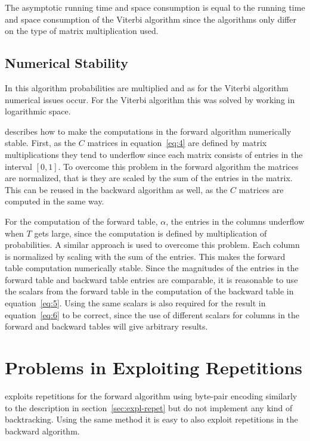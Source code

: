 The asymptotic running time and space consumption is equal to the running time
and space consumption of the Viterbi algorithm since the algorithms only
differ on the type of matrix multiplication used.

\subsection{Numerical Stability}

In this algorithm probabilities are multiplied and as for the Viterbi algorithm
numerical issues occur. For the Viterbi algorithm this was solved by working in
logarithmic space.

\citet{sand2013ziphmmlib} describes how to make the computations in the forward
algorithm numerically stable. First, as the $C$ matrices in
equation~\eqref{eq:4} are defined by matrix multiplications they tend to
underflow since each matrix consists of entries in the interval $[0, 1]$. To
overcome this problem in the forward algorithm the matrices are normalized,
that is they are scaled by the sum of the entries in the matrix. This can be
reused in the backward algorithm as well, as the $C$ matrices are computed in
the same way.

For the computation of the forward table, $\alpha$, the entries in the columns underflow when
$T$ gets large, since the computation is defined by multiplication of
probabilities. A similar approach is used to overcome this problem. Each column
is normalized by scaling with the sum of the entries. This makes the forward
table computation numerically stable. Since the magnitudes of the entries in
the forward table and backward table entries are comparable, it is reasonable
to use the scalars from the forward table in the computation of the backward
table in equation~\eqref{eq:5}. Using the same scalars is also required for the
result in equation~\eqref{eq:6} to be correct, since the use of different
scalars for columns in the forward and backward tables will give arbitrary
results.



\section{Problems in Exploiting Repetitions}
\label{sec:probl-expl-repet}

\citet{sand2013ziphmmlib} exploits repetitions for the forward algorithm using
byte-pair encoding similarly to the description in
section~\ref{sec:expl-repet} but do not implement any kind of backtracking. Using
the same method it is easy to also exploit repetitions in the backward
algorithm.

